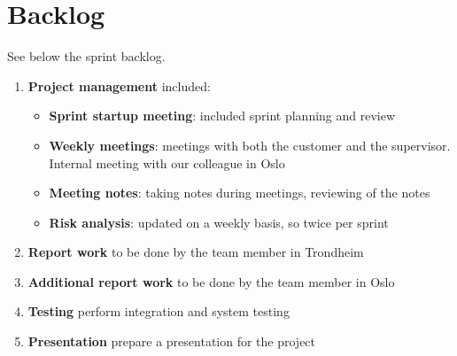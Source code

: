 \section{Backlog}
See below the sprint backlog.
\begin{enumerate}[1.]
\item \textbf{Project management} included:
	\begin{itemize}
		\item \textbf{Sprint startup meeting}:
			included sprint planning and review
		\item \textbf{Weekly meetings}: 
			meetings with both the customer and the supervisor. Internal meeting with our colleague in Oslo
		\item \textbf{Meeting notes}:
			taking notes during meetings, reviewing of the notes
		\item \textbf{Risk analysis}:
			updated on a weekly basis, so twice per sprint
	\end{itemize}
	\item \textbf{Report work}
		to be done by the team member in Trondheim
	\item \textbf{Additional report work}
		to be done by the team member in Oslo
	\item \textbf{Testing}
		perform integration and system testing
	\item \textbf{Presentation}
		prepare a presentation for the project
\end{enumerate}
